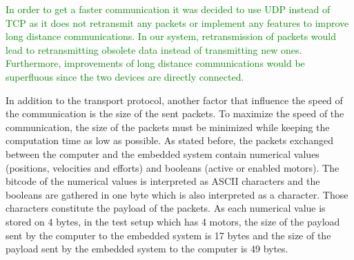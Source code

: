\textcolor{green}{In order to get a faster communication it was decided to use UDP instead of TCP as it does not retransmit any packets or implement any features to improve long distance communications. In our system, retransmission of packets would lead to retransmitting obsolete data instead of transmitting new ones. Furthermore, improvements of long distance communications would be superfluous since the two devices are directly connected.}

{\color{red}In addition to the transport protocol, another factor that influence the speed of the communication is the size of the sent packets. To maximize the speed of the communication, the size of the packets must be minimized while keeping the computation time as low as possible. As stated before, the packets exchanged between the computer and the embedded system contain numerical values (positions, velocities and efforts) and booleans (active or enabled motors). The bitcode of the numerical values is interpreted as ASCII characters and the booleans are gathered in one byte which is also interpreted as a character. Those characters constitute the payload of the packets. As each numerical value is stored on 4 bytes, in the test setup which has 4 motors, the size of the payload sent by the computer to the embedded system is 17 bytes and the size of the payload sent by the embedded system to the computer is 49 bytes.}

